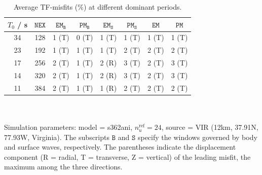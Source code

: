 \documentclass[extra,referee]{gji}
\begin{document}
\FloatBarrier
\begin{table}
\begin{minipage}{\columnwidth}
\caption{Average TF-misfits ($\%$) at different dominant periods.}
\label{tab:freq}
\setlength{\tabcolsep}{.7cm}
\begin{tabular*}{\textwidth}{cccccccc}
$T_0$ / s & $\mathtt{NEX}$ & $\mathtt{EM_B}$ & $\mathtt{PM_B}$ & 
$\mathtt{EM_S}$ & $\mathtt{PM_S}$ & $\mathtt{EM}$ & $\mathtt{PM}$\\[2pt]
\hline
34 & 128 &
1 {\scriptsize(T)}&
0 {\scriptsize(T)}&
1 {\scriptsize(T)}&
1 {\scriptsize(T)}&
1 {\scriptsize(T)}&
1 {\scriptsize(T)}\\[2pt]
23 & 192 &
1 {\scriptsize(T)}&
1 {\scriptsize(T)}&
1 {\scriptsize(T)}&
2 {\scriptsize(T)}&
2 {\scriptsize(T)}&
2 {\scriptsize(T)}\\[2pt]
17 & 256 &
2 {\scriptsize(T)}&
1 {\scriptsize(T)}&
2 {\scriptsize(R)}&
3 {\scriptsize(T)}&
2 {\scriptsize(T)}&
3 {\scriptsize(T)}\\[2pt]
14 & 320 &
2 {\scriptsize(T)}&
1 {\scriptsize(T)}&
2 {\scriptsize(R)}&
3 {\scriptsize(T)}&
2 {\scriptsize(T)}&
3 {\scriptsize(T)}\\[2pt]
11 & 384 & 
2 {\scriptsize(T)}&
1 {\scriptsize(T)}&
1 {\scriptsize(R)}&
2 {\scriptsize(T)}&
2 {\scriptsize(T)}&
2 {\scriptsize(T)}\\[2pt]
\hline
\end{tabular*}
\\\\
Simulation parameters: model = s362ani, $n_u^\text{ref}=24$, 
source = VIR (12km, 37.91\degr N, 77.93\degr W, Virginia).
The subscripts $\mathtt{B}$ and $\mathtt{S}$ specify the windows 
governed by body and surface waves, respectively.
The parentheses indicate the displacement component 
(R = radial, T = transverse, Z = vertical) of the leading misfit, 
the maximum among the three directions.
\end{minipage}
\end{table}
\newpage 
\end{document}
